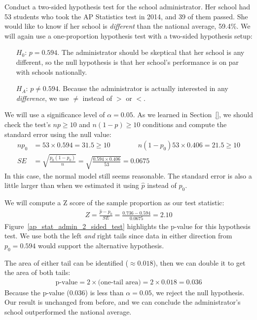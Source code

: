 \begin{example}{Conduct a two-sided hypothesis test for the school administrator. Her school had 53 students who took the AP Statistics test in 2014, and 39 of them passed. She would like to know if her school is \emph{different} than the national average, 59.4\%.}
We will again use a one-proportion hypothesis test with a two-sided hypothesis setup:
\begin{itemize}
\item[$H_0$:] $p = 0.594$. The administrator should be skeptical that her school is any different, so the null hypothesis is that her school's performance is on par with schools nationally.
\item[$H_A$:] $p \neq 0.594$. Because the administrator is actually interested in any \emph{difference}, we use $\neq$ instead of $>$ or $<$.
\end{itemize}
We will use a significance level of $\alpha = 0.05$. As we learned in Section~\ref{}, we should check the test's $np \geq 10$ and $n(1-p) \geq 10$ conditions and compute the standard error using the null value:
\begin{align*}
np_0
	&= 53 \times 0.594
	= 31.5
	\geq 10
	\qquad\qquad
	n(1-p_0)
		53 \times 0.406
		= 21.5
		\geq 10 \\
SE &= \sqrt{\frac{p_0 (1 - p_0)}{n}}
	= \sqrt{\frac{0.594 \times 0.406}{53}}
	= 0.0675
\end{align*}
In this case, the normal model still seems reasonable. The standard error is also a little larger than when we estimated it using $\hat{p}$ instead of $p_0$.

We will compute a Z score of the sample proportion as our test statistic:
\begin{align*}
Z = \frac{\hat{p} - p_0}{SE}
	= \frac{0.736 - 0.594}{0.0675}
	= 2.10
\end{align*}
Figure~\ref{ap_stat_admin_2_sided_test} highlights the p-value for this hypothesis test. We use both the left \emph{and} right tails since data in either direction from $p_0 = 0.594$ would support the alternative hypothesis.

The area of either tail can be identified ($\approx0.018$), then we can double it to get the area of both tails:
\begin{align*}
\text{p-value}
	= 2 \times \text{(one-tail area)}
	= 2 \times 0.018
	= 0.036
\end{align*}
Because the p-value (0.036) is less than $\alpha = 0.05$, we reject the null hypothesis. Our result is unchanged from before, and we can conclude the administrator's school  outperformed the national average.
\end{example}

